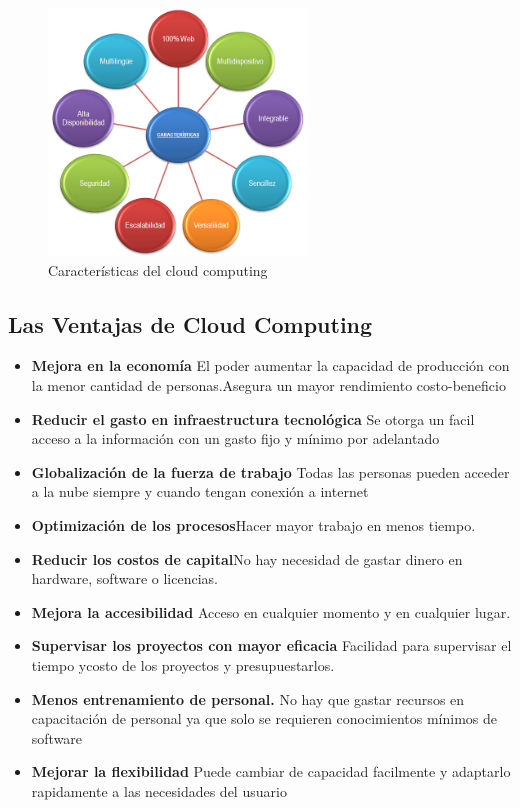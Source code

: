 \documentclass[12pt,a4paper]{article}
\begin{document}
\begin{figure}[h!]
 \centering
 \includegraphics[width=0.61\textwidth]{Caracteristicas2.png}
 \caption[Características]{Características del cloud computing}
\end{figure} 

\subsection{Las Ventajas de Cloud Computing}

\begin {itemize}
\item \textbf{Mejora en la economía} El poder aumentar la
capacidad de producción con la menor cantidad de
personas.Asegura un mayor rendimiento costo-beneficio

\item \textbf{Reducir el gasto en infraestructura tecnológica}
Se otorga un facil acceso a la información con un gasto fijo y
mínimo por adelantado

\item \textbf{Globalización de la fuerza de trabajo } Todas las
personas pueden acceder a la nube siempre y cuando tengan
conexión a internet
\item \textbf{Optimización de los procesos}Hacer mayor trabajo
en menos tiempo.
 
\item \textbf{Reducir los costos de capital}No hay necesidad de
gastar dinero en hardware, software o licencias.
 
\item \textbf{Mejora la accesibilidad} Acceso en cualquier
momento y en cualquier lugar.
  
\item \textbf{Supervisar los proyectos con mayor eficacia}
Facilidad para supervisar el tiempo ycosto de los proyectos y
presupuestarlos.
 
\item \textbf{ Menos entrenamiento de personal.} No hay que
gastar recursos en capacitación de personal ya que solo se
requieren conocimientos mínimos de software
  
\item \textbf{ Mejorar la flexibilidad} Puede cambiar de
capacidad facilmente y adaptarlo rapidamente a las necesidades
del usuario
    
\end{itemize}
\end{document}
